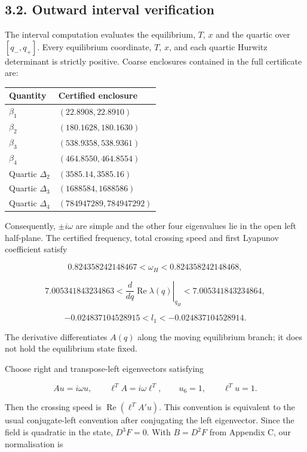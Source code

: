 \documentclass[
  11pt,
]{article}
\newcounter{none} %
\begin{document}
\subsection{3.2. Outward interval
verification}\label{outward-interval-verification}

The interval computation evaluates the equilibrium, \(T\), \(x\) and the
quartic over \([q_-,q_+]\). Every equilibrium coordinate, \(T\), \(x\),
and each quartic Hurwitz determinant is strictly positive. Coarse
enclosures contained in the full certificate are:

{\def\LTcaptype{none} %
\begin{longtable}[]{@{}ll@{}}
\toprule\noalign{}
Quantity & Certified enclosure \\
\midrule\noalign{}
\endhead
\bottomrule\noalign{}
\endlastfoot
\(\beta_1\) & \((22.8908,22.8910)\) \\
\(\beta_2\) & \((180.1628,180.1630)\) \\
\(\beta_3\) & \((538.9358,538.9361)\) \\
\(\beta_4\) & \((464.8550,464.8554)\) \\
Quartic \(\Delta_2\) & \((3585.14,3585.16)\) \\
Quartic \(\Delta_3\) & \((1688584,1688586)\) \\
Quartic \(\Delta_4\) & \((784947289,784947292)\) \\
\end{longtable}
}

Consequently, \(\pm i\omega\) are simple and the other four eigenvalues
lie in the open left half-plane. The certified frequency, total crossing
speed and first Lyapunov coefficient satisfy

\[
0.824358242148467<\omega_H<0.824358242148468, \tag{3.6}
\]

\[
7.005341843234863<
\left.\frac{d}{dq}\operatorname{Re}\lambda(q)\right|_{q_H}
<7.005341843234864, \tag{3.7}
\]

\[
-0.024837104528915<l_1<-0.024837104528914. \tag{3.8}
\]

The derivative differentiates \(A(q)\) along the moving equilibrium
branch; it does not hold the equilibrium state fixed.

Choose right and transpose-left eigenvectors satisfying

\[
Au=i\omega u,\qquad \ell^TA=i\omega\ell^T,
\qquad u_6=1,\qquad \ell^Tu=1.
\]

Then the crossing speed is \(\operatorname{Re}(\ell^TA'u)\). This
convention is equivalent to the usual conjugate-left convention after
conjugating the left eigenvector. Since the field is quadratic in the
state, \(D^3F=0\). With \(B=D^2F\) from Appendix C, our normalisation is
\end{document}
